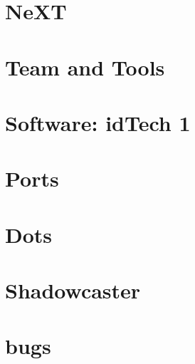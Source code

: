 \documentclass{book}
\begin{document}
        


        
     \chapter{NeXT}
          


    

    \chapter{Team and Tools}
       
       
       
      
      
      
      
      




     \chapter{Software: idTech 1}
      
      
      
      
       
       
       
       
       
       
       
       
          
       
      

    \chapter{Ports}        
          



    \appendix
    \appendixpage
    \chapter{Dots}  
      
      \chapter{Shadowcaster}  
      
      \chapter{bugs}
      
\end{document}
